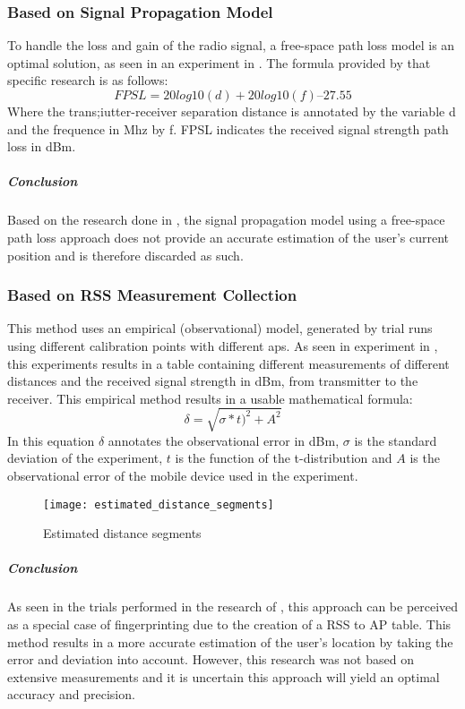 \subsubsection{Based on Signal Propagation Model}
To handle the loss and gain of the radio signal, a free-space path loss model is an optimal solution, as seen in an experiment in \cite[p.178]{Shchekotov}. The formula provided by that specific research is as follows:
\begin{equation}
FPSL = 20log10(d) + 20log10(f) – 27.55
\end{equation}
Where the trans;iutter-receiver separation distance is annotated by the variable d and the frequence in Mhz by f. FPSL indicates the received signal strength path loss in dBm.
\subparagraph{Conclusion}
Based on the research done in \cite{Shchekotov}, the signal propagation model using a free-space path loss approach does not provide an accurate estimation of the user's current position and is therefore discarded as such.
\subsubsection{Based on RSS Measurement Collection}
This method uses an empirical (observational) model, generated by trial runs using different calibration points with different \acrlong{ap}s. As seen in experiment in \cite{Shchekotov}, this experiments results in a table containing different measurements of different distances and the received signal strength in dBm, from transmitter to the receiver. This empirical method results in a usable mathematical formula:
\begin{equation}
\delta = \sqrt{\sigma * t)^2 + A^2}
\end{equation}
In this equation $\delta$ annotates the observational error in dBm, $\sigma$ is the standard deviation of the experiment, $t$ is the function of the t-distribution and $A$ is the observational error of the mobile device used in the experiment.
\begin{figure}[h!]
\centering
\texttt{[image: estimated\_distance\_segments]}
\caption{Estimated distance segments ~\cite[p.179]{Shchekotov}}
\label{fig:euclidean}
\end{figure}
\subparagraph{Conclusion}
As seen in the trials performed in the research of \cite{Shchekotov}, this approach can be perceived as a special case of fingerprinting due to the creation of a RSS to AP table. This method results in a more accurate estimation of the user's location by taking the error and deviation into account. However, this research was not based on extensive measurements and it is uncertain this approach will yield an optimal accuracy and precision.
